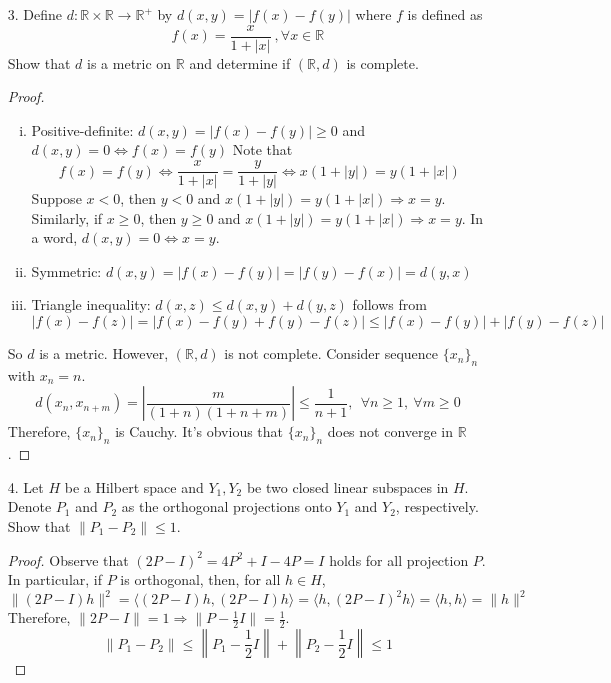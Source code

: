 \begin{itemize}
	\item[3.] Define $d : \mathbb{R} \times \mathbb{R} \rightarrow \mathbb{R}^+$ by $d(x, y) = |f(x) -f(y)|$ where $f$ is defined as
	$$
	f(x) = \frac{x}{1+|x|}~
	, \forall x\in \mathbb{R}
	$$
	Show that $d$ is a metric on $\mathbb{R}$ and determine if $(\mathbb{R}, d)$ is complete.

	\begin{proof}
		\begin{enumerate}[(i)]
			\item Positive-definite: $d(x,y) = |f(x) - f(y)| \ge 0$ and $d(x,y) = 0 \Leftrightarrow f(x) = f(y)$
			Note that
			$$
			f(x) = f(y) \Leftrightarrow \frac{x}{1+|x|} = \frac{y}{1+|y|} \Leftrightarrow x(1+|y|) = y(1+|x|)
			$$
			Suppose $x< 0$, then $y<0$ and $x(1+|y|) = y(1+|x|) \Rightarrow x = y$. Similarly, if $x\ge 0$, then $y\ge 0$ and $x(1+|y|) = y(1+|x|)\Rightarrow x =y$. In a word, $d(x,y) = 0 \Leftrightarrow x=y$.
			\item Symmetric: $d(x,y) = |f(x)-f(y)| = |f(y)-f(x)| = d(y,x)$
			\item Triangle inequality: $d(x, z)\le d(x,y)+ d(y,z)$ follows from 
			$$|f(x)-f(z)| = |f(x)-f(y)+f(y)-f(z)| \le |f(x)-f(y)| + |f(y)-f(z)|$$ 
		\end{enumerate}
		So $d$ is a metric. However, $(\mathbb{R}, d)$ is not complete. Consider sequence $\{x_n\}_n$ with $x_n = n$. 
		$$
		d(x_n, x_{n+m}) = \left\lvert \frac{m}{(1+n)(1+n+m)} \right\rvert \le \frac{1}{n+1}, ~~\forall n\ge 1, ~\forall m\ge 0  
		$$
		Therefore, $\{x_n\}_n$ is Cauchy. It's obvious that $\{x_n\}_n$ does not converge in $\mathbb{R}$.
	\end{proof}
	
	\item[4.] Let $H$ be a Hilbert space and $Y_1, Y_2$ be two closed linear subspaces in $H$. Denote $P_1$
	and $P_2$ as the orthogonal projections onto $Y_1$ and $Y_2$, respectively. Show that $\lVert P_1 -P_2\rVert \le  1$.
	\begin{proof}
		Observe that $(2P-I)^2 = 4P^2+I-4P = I$ holds for all projection $P$. In particular, if $P$ is orthogonal, then, for all $h\in H$,
		$$
		\lVert (2P-I)h\rVert^2  =\langle (2P-I)h, (2P-I)h\rangle = \langle h, (2P-I)^2h\rangle =\langle h, h\rangle = \lVert h\rVert^2 
		$$
		Therefore, $\lVert 2P - I\rVert = 1 \Rightarrow \lVert P -\frac{1}{2}I\rVert = \frac{1}{2}$. 
		$$
		\lVert P_1 - P_2\rVert \le \left\lVert P_1 -\frac{1}{2}I \right\rVert + \left\lVert P_2 - \frac{1}{2}I\right\rVert \le 1
		$$
	\end{proof}


\end{itemize}
